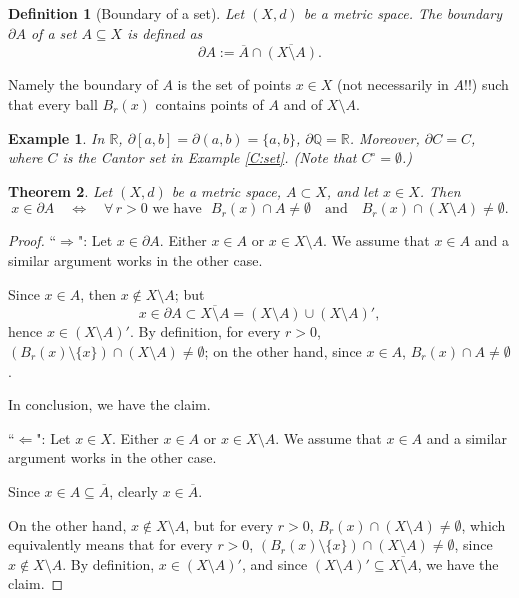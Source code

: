 \documentclass[a4paper,reqno]{amsart}
\numberwithin{equation}{section}
\newtheorem{definition}{Definition}[section]
\newtheorem{theorem}[definition]{Theorem}
\newtheorem{example}{Example}
\def\R{\mathbb{R}}
\begin{document}
\begin{definition}[Boundary of a set]
Let $(X,d)$ be a metric space. The \emph{boundary} $\partial A$ of a set $A \subseteq X$ is defined as
$$
\partial A:= \overline A\cap \overline{(X\setminus A)}.
$$
\end{definition}

Namely the boundary of $A$ is the set of points $x\in X$ (not necessarily in $A$!!) such that every ball $B_r(x)$ contains points of $A$ and of $X\setminus A$.

\begin{example}
In $\R$, $\partial [a,b] = \partial (a,b) = \{a,b\}$, $\partial \mathbb{Q} = \R$. Moreover, $\partial C= C$, where $C$ is the Cantor set in Example \ref{C:set}.
(Note that $C^\circ = \emptyset$.)

\end{example}


\begin{theorem}
Let $(X,d)$ be a metric space, $A\subset X$, and let $x\in X$. Then
$$
x\in \partial A \quad \Leftrightarrow \quad \forall \, r>0 \,\, \textrm{we have } \,\, B_r(x)\cap A\neq \emptyset \quad \textrm{and} \quad B_r(x)\cap (X\setminus A)\neq \emptyset.
$$
\end{theorem}

\begin{proof}
``$\Rightarrow$": Let $x\in \partial A$. Either $x\in A$ or $x\in X\setminus A$. We assume that $x\in A$ and a similar argument works in the other case.

Since $x\in A$, then $x\notin X\setminus A$; but
$$
x\in \partial A\subset \overline{X\setminus A} = (X\setminus A)\cup (X\setminus A)',
$$
hence $x\in (X\setminus A)'$. By definition, for every $r>0$, $(B_r(x)\setminus \{x\})\cap (X\setminus A)\neq \emptyset$; on the other hand, since
$x\in A$, $B_r(x)\cap A\neq \emptyset$.

In conclusion, we have the claim.
\medskip

``$\Leftarrow$": Let $x\in X$. Either $x\in A$ or $x\in X\setminus A$. We assume that $x\in A$ and a similar argument works in the other case.

Since $x\in A\subseteq \overline A$, clearly $x\in \overline A$.

On the other hand, $x\notin X\setminus A$, but for every $r>0$, $B_r(x) \cap (X\setminus A) \neq \emptyset$, which equivalently means that
for every $r>0$, $(B_r(x)\setminus \{x\})\cap (X\setminus A)\neq \emptyset$, since $x\notin X\setminus A$. By definition, $x\in (X\setminus A)'$,
and since $(X\setminus A)'\subseteq \overline{X\setminus A}$, we have the claim.

\end{proof}
\end{document}
